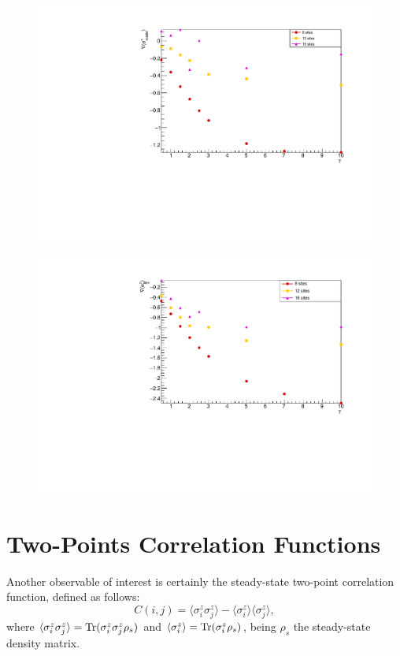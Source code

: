 \begin{figure}[H]
    \centering
    \includegraphics[scale=0.7]{Figures/gradLMvsGammavsSize.pdf}
    \caption{}
    \label{fig:my_label}
\end{figure}

\begin{figure}[H]
    \centering
    \includegraphics[scale=0.7]{Figures/gradLMvsGammavsSize_firstQuarterChain.pdf}
    \caption{}
    \label{fig:my_label}
\end{figure}

\section{Two-Points Correlation Functions}
Another observable of interest is certainly the steady-state two-point correlation function, defined as follows:
\begin{equation}
    C(i, j) = \langle \sigma^z_i \sigma^z_j \rangle - \langle \sigma^z_i \rangle \langle \sigma^z_j \rangle,
\end{equation}
where $\langle \sigma^z_i \sigma^z_j \rangle = \operatorname{Tr}(\sigma^z_i \sigma^z_j \rho_{s})$ and $\langle \sigma^z_i \rangle = \operatorname{Tr}(\sigma^z_i \rho_{s})$, being $\rho_{s}$ the steady-state density matrix.


